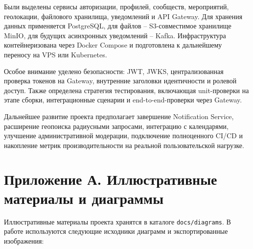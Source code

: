 Были выделены сервисы авторизации, профилей, сообществ, мероприятий, геолокации, файлового хранилища, уведомлений и API Gateway. Для хранения данных применяется PostgreSQL, для файлов -- S3-совместимое хранилище MinIO, для будущих асинхронных уведомлений -- Kafka. Инфраструктура контейнеризована через Docker Compose и подготовлена к дальнейшему переносу на VPS или Kubernetes.

Особое внимание уделено безопасности: JWT, JWKS, централизованная проверка токенов на Gateway, внутренние заголовки идентичности и ролевой доступ. Также определена стратегия тестирования, включающая unit-проверки на этапе сборки, интеграционные сценарии и end-to-end-проверки через Gateway.

Дальнейшее развитие проекта предполагает завершение Notification Service, расширение геопоиска радиусными запросами, интеграцию с календарями, улучшение административной модерации, подключение полноценного CI/CD и накопление метрик производительности на реальной пользовательской нагрузке.

\newpage
\printbibliography[heading=bibintoc,title={СПИСОК ИСПОЛЬЗОВАННЫХ ИСТОЧНИКОВ}]

\newpage
\appendix
\section*{Приложение А. Иллюстративные материалы и диаграммы}

Иллюстративные материалы проекта хранятся в каталоге \texttt{docs/diagrams}. В работе используются следующие исходники диаграмм и экспортированные изображения:

